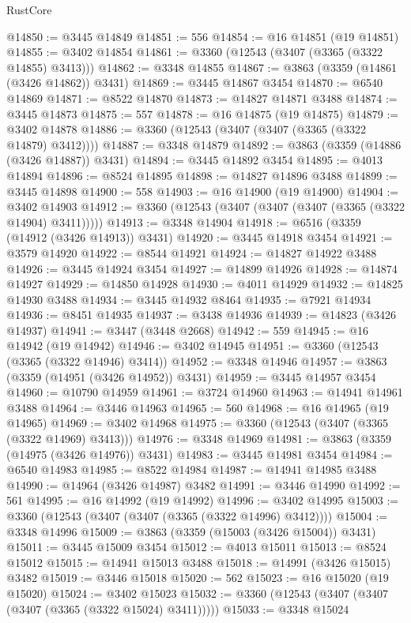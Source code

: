 \begin{lexlean}{RustCore}
\begin{coremodule}
@14850 := @3445 @14849
@14851 := 556
@14854 := @16 @14851 (@19 @14851)
@14855 := @3402 @14854
@14861 := @3360 (@12543 (@3407 (@3365 (@3322 @14855) @3413)))
@14862 := @3348 @14855
@14867 := @3863 (@3359 (@14861 (@3426 @14862)) @3431)
@14869 := @3445 @14867 @3454
@14870 := @6540 @14869
@14871 := @8522 @14870
@14873 := @14827 @14871 @3488
@14874 := @3445 @14873
@14875 := 557
@14878 := @16 @14875 (@19 @14875)
@14879 := @3402 @14878
@14886 := @3360 (@12543 (@3407 (@3407 (@3365 (@3322 @14879) @3412))))
@14887 := @3348 @14879
@14892 := @3863 (@3359 (@14886 (@3426 @14887)) @3431)
@14894 := @3445 @14892 @3454
@14895 := @4013 @14894
@14896 := @8524 @14895
@14898 := @14827 @14896 @3488
@14899 := @3445 @14898
@14900 := 558
@14903 := @16 @14900 (@19 @14900)
@14904 := @3402 @14903
@14912 := @3360 (@12543 (@3407 (@3407 (@3407 (@3365 (@3322 @14904) @3411)))))
@14913 := @3348 @14904
@14918 := @6516 (@3359 (@14912 (@3426 @14913)) @3431)
@14920 := @3445 @14918 @3454
@14921 := @3579 @14920
@14922 := @8544 @14921
@14924 := @14827 @14922 @3488
@14926 := @3445 @14924 @3454
@14927 := @14899 @14926
@14928 := @14874 @14927
@14929 := @14850 @14928
@14930 := @4011 @14929
@14932 := @14825 @14930 @3488
@14934 := @3445 @14932 @8464
@14935 := @7921 @14934
@14936 := @8451 @14935
@14937 := @3438 @14936
@14939 := @14823 (@3426 @14937)
@14941 := @3447 (@3448 @2668)
@14942 := 559
@14945 := @16 @14942 (@19 @14942)
@14946 := @3402 @14945
@14951 := @3360 (@12543 (@3365 (@3322 @14946) @3414))
@14952 := @3348 @14946
@14957 := @3863 (@3359 (@14951 (@3426 @14952)) @3431)
@14959 := @3445 @14957 @3454
@14960 := @10790 @14959
@14961 := @3724 @14960
@14963 := @14941 @14961 @3488
@14964 := @3446 @14963
@14965 := 560
@14968 := @16 @14965 (@19 @14965)
@14969 := @3402 @14968
@14975 := @3360 (@12543 (@3407 (@3365 (@3322 @14969) @3413)))
@14976 := @3348 @14969
@14981 := @3863 (@3359 (@14975 (@3426 @14976)) @3431)
@14983 := @3445 @14981 @3454
@14984 := @6540 @14983
@14985 := @8522 @14984
@14987 := @14941 @14985 @3488
@14990 := @14964 (@3426 @14987) @3482
@14991 := @3446 @14990
@14992 := 561
@14995 := @16 @14992 (@19 @14992)
@14996 := @3402 @14995
@15003 := @3360 (@12543 (@3407 (@3407 (@3365 (@3322 @14996) @3412))))
@15004 := @3348 @14996
@15009 := @3863 (@3359 (@15003 (@3426 @15004)) @3431)
@15011 := @3445 @15009 @3454
@15012 := @4013 @15011
@15013 := @8524 @15012
@15015 := @14941 @15013 @3488
@15018 := @14991 (@3426 @15015) @3482
@15019 := @3446 @15018
@15020 := 562
@15023 := @16 @15020 (@19 @15020)
@15024 := @3402 @15023
@15032 := @3360 (@12543 (@3407 (@3407 (@3407 (@3365 (@3322 @15024) @3411)))))
@15033 := @3348 @15024

\end{coremodule}
\end{lexlean}
